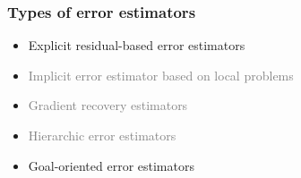 \begin{frame}
  \frametitle{Types of error estimators}
 
  \begin{itemize}
    \item Explicit residual-based error estimators
    \item \textcolor{grey}{Implicit error estimator based on local problems}
    \item \textcolor{grey}{Gradient recovery estimators}
    \item \textcolor{grey}{Hierarchic error estimators}
    \item Goal-oriented error estimators
  \end{itemize}

\end{frame}

